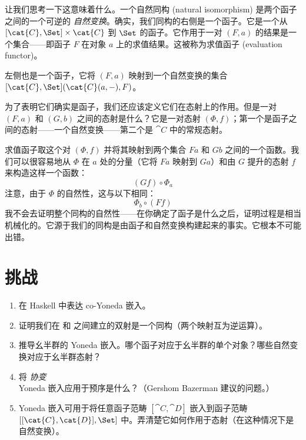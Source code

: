让我们思考一下这意味着什么。一个自然同构 (natural isomorphism) 是两个函子之间的一个可逆的 \emph{自然变换}。确实，我们同构的右侧是一个函子。它是一个从 $[\cat{C}, \Set] \times \cat{C}$ 到 $\Set$ 的函子。它作用于一对 $(F, a)$ 的结果是一个集合——即函子 $F$ 在对象 $a$ 上的求值结果。这被称为求值函子 (evaluation functor)。

左侧也是一个函子，它将 $(F, a)$ 映射到一个自然变换的集合 $[\cat{C}, \Set](\cat{C}(a, -), F)$。

为了表明它们确实是函子，我们还应该定义它们在态射上的作用。但是一对 $(F, a)$ 和 $(G, b)$ 之间的态射是什么？它是一对态射 $(\Phi, f)$；第一个是函子之间的态射——一个自然变换——第二个是 $\cat{C}$ 中的常规态射。

求值函子取这个对 $(\Phi, f)$ 并将其映射到两个集合 $F a$ 和 $G b$ 之间的一个函数。我们可以很容易地从 $\Phi$ 在 $a$ 处的分量（它将 $F a$ 映射到 $G a$）和由 $G$ 提升的态射 $f$ 来构造这样一个函数：
\[(G f) \circ \Phi_a\]
注意，由于 $\Phi$ 的自然性，这与以下相同：
\[\Phi_b \circ (F f)\]
我不会去证明整个同构的自然性——在你确定了函子是什么之后，证明过程是相当机械化的。它源于我们的同构是由函子和自然变换构建起来的事实。它根本不可能出错。

\section{挑战}

\begin{enumerate}
  \tightlist
  \item
        在 Haskell 中表达 co-Yoneda 嵌入。
  \item
        证明我们在  和  之间建立的双射是一个同构（两个映射互为逆运算）。
  \item
        推导幺半群的 Yoneda 嵌入。哪个函子对应于幺半群的单个对象？哪些自然变换对应于幺半群态射？
  \item
        将 \emph{协变} Yoneda 嵌入应用于预序是什么？（Gershom Bazerman 建议的问题。）
  \item
        Yoneda 嵌入可用于将任意函子范畴 $[\cat{C}, \cat{D}]$ 嵌入到函子范畴 $[[\cat{C}, \cat{D}], \Set]$ 中。弄清楚它如何作用于态射（在这种情况下是自然变换）。
\end{enumerate}